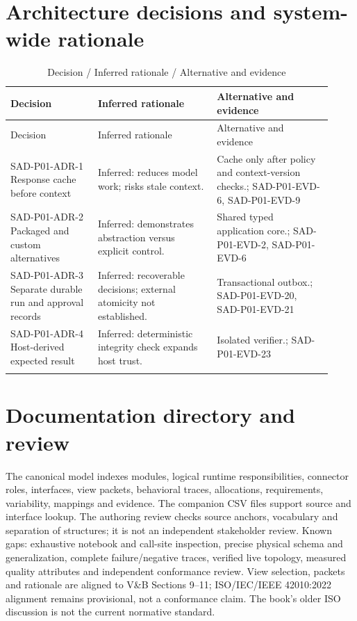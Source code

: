 \documentclass[10pt,letterpaper]{article}
\begin{document}
\section{Architecture decisions and system-wide rationale}
\begin{longtable}{@{}>{\raggedright\arraybackslash}p{0.25\linewidth}>{\raggedright\arraybackslash}p{0.34\linewidth}>{\raggedright\arraybackslash}p{0.33\linewidth}@{}}
\caption{Decision / Inferred rationale / Alternative and evidence}\\
\toprule Decision & Inferred rationale & Alternative and evidence\\\midrule\endfirsthead
\toprule Decision & Inferred rationale & Alternative and evidence\\\midrule\endhead
SAD-P01-ADR-1 Response cache before context & Inferred: reduces model work; risks stale context. & Cache only after policy and context-version checks.; SAD-P01-EVD-6, SAD-P01-EVD-9\\\addlinespace
SAD-P01-ADR-2 Packaged and custom alternatives & Inferred: demonstrates abstraction versus explicit control. & Shared typed application core.; SAD-P01-EVD-2, SAD-P01-EVD-6\\\addlinespace
SAD-P01-ADR-3 Separate durable run and approval records & Inferred: recoverable decisions; external atomicity not established. & Transactional outbox.; SAD-P01-EVD-20, SAD-P01-EVD-21\\\addlinespace
SAD-P01-ADR-4 Host-derived expected result & Inferred: deterministic integrity check expands host trust. & Isolated verifier.; SAD-P01-EVD-23\\\addlinespace
\bottomrule\end{longtable}

\section{Documentation directory and review}
The canonical model indexes modules, logical runtime responsibilities, connector roles, interfaces, view packets, behavioral traces, allocations, requirements, variability, mappings and evidence. The companion CSV files support source and interface lookup. The authoring review checks source anchors, vocabulary and separation of structures; it is not an independent stakeholder review. Known gaps: exhaustive notebook and call-site inspection, precise physical schema and generalization, complete failure/negative traces, verified live topology, measured quality attributes and independent conformance review. View selection, packets and rationale are aligned to V\&B Sections 9--11; ISO/IEC/IEEE 42010:2022 alignment remains provisional, not a conformance claim. The book's older ISO discussion is not the current normative standard.
\appendix
\end{document}
